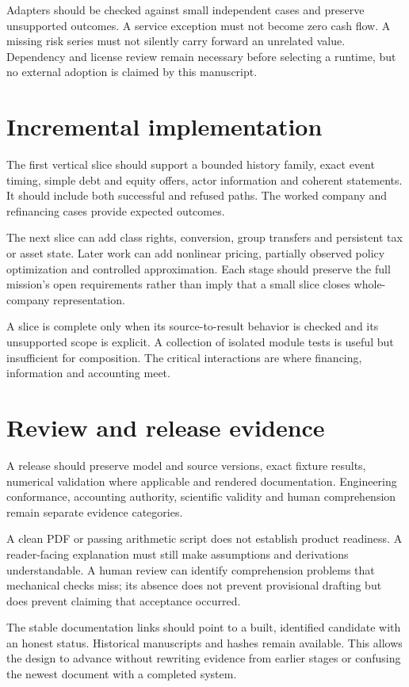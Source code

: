 Adapters should be checked against small independent cases and preserve unsupported outcomes. A service exception must not become zero cash flow. A missing risk series must not silently carry forward an unrelated value. Dependency and license review remain necessary before selecting a runtime, but no external adoption is claimed by this manuscript.

\section{Incremental implementation}
The first vertical slice should support a bounded history family, exact event timing, simple debt and equity offers, actor information and coherent statements. It should include both successful and refused paths. The worked company and refinancing cases provide expected outcomes.

The next slice can add class rights, conversion, group transfers and persistent tax or asset state. Later work can add nonlinear pricing, partially observed policy optimization and controlled approximation. Each stage should preserve the full mission's open requirements rather than imply that a small slice closes whole-company representation.

A slice is complete only when its source-to-result behavior is checked and its unsupported scope is explicit. A collection of isolated module tests is useful but insufficient for composition. The critical interactions are where financing, information and accounting meet.

\section{Review and release evidence}
A release should preserve model and source versions, exact fixture results, numerical validation where applicable and rendered documentation. Engineering conformance, accounting authority, scientific validity and human comprehension remain separate evidence categories.

A clean PDF or passing arithmetic script does not establish product readiness. A reader-facing explanation must still make assumptions and derivations understandable. A human review can identify comprehension problems that mechanical checks miss; its absence does not prevent provisional drafting but does prevent claiming that acceptance occurred.

The stable documentation links should point to a built, identified candidate with an honest status. Historical manuscripts and hashes remain available. This allows the design to advance without rewriting evidence from earlier stages or confusing the newest document with a completed system.
